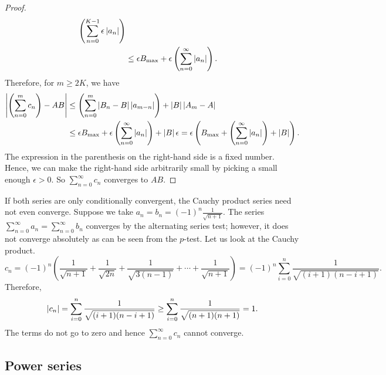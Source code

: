 \begin{proof}
\begin{equation*}
\begin{split}
\left(
\sum_{n=0}^{K-1}
  \epsilon \left\lvert {a_{n}} \right\rvert
\right)
\\
& \leq
\epsilon
B_{\text{max}}
+
\epsilon
\left(
\sum_{n=0}^\infty \left\lvert {a_{n}} \right\rvert
\right) .
\end{split}
\end{equation*}
Therefore, for $m \geq 2K$, we have
\begin{equation*}
\begin{split}
\left\lvert {\left(\sum_{n=0}^m c_n \right) - AB} \right\rvert
& \leq
\left(
\sum_{n=0}^m
  \left\lvert { B_n -  B } \right\rvert \left\lvert {a_{m-n}} \right\rvert
\right)
+
\left\lvert {B} \right\rvert\left\lvert {A_m - A} \right\rvert
\\
& \leq
\epsilon
B_{\text{max}}
+
\epsilon
\left(
\sum_{n=0}^\infty \left\lvert {a_{n}} \right\rvert
\right)
+
\left\lvert {B} \right\rvert\epsilon
=
\epsilon 
\left(
B_{\text{max}}
+
\left(
\sum_{n=0}^\infty \left\lvert {a_{n}} \right\rvert
\right)
+
\left\lvert {B} \right\rvert
\right) .
\end{split}
\end{equation*}
The expression in the parenthesis on the right-hand side
is a fixed number.
Hence,
we can make the right-hand side arbitrarily small by picking a small enough
$\epsilon> 0$.  So $\sum_{n=0}^\infty c_n$ converges to $AB$.
\end{proof}

\begin{example}
If both series are only conditionally convergent, the Cauchy product series
need not even converge.
Suppose we take $a_n = b_n = {(-1)}^n \frac{1}{\sqrt{n+1}}$.
The series $\sum_{n=0}^\infty a_n = \sum_{n=0}^\infty b_n$
converges
by the alternating series test; however, it does not converge
absolutely as can be seen from the $p$-test.  Let us look
at the Cauchy product.
\begin{equation*}
c_n = 
{(-1)}^n
\left(
\frac{1}{\sqrt{n+1}} + 
\frac{1}{\sqrt{2n}} + 
\frac{1}{\sqrt{3(n-1)}} + \cdots +
\frac{1}{\sqrt{n+1}}
\right)
=
{(-1)}^n
\sum_{i=0}^n \frac{1}{\sqrt{(i+1)(n-i+1)}} .
\end{equation*}
Therefore,
\begin{equation*}
\left\lvert {c_n} \right\rvert 
=
\sum_{i=0}^n \frac{1}{\sqrt{(i+1)(n-i+1)}} 
\geq
\sum_{i=0}^n \frac{1}{\sqrt{(n+1)(n+1)}} 
= 1 .
\end{equation*}
The terms do not go to zero and hence $\sum_{n=0}^\infty c_n$ cannot converge.
\end{example}

\subsection{Power series}

